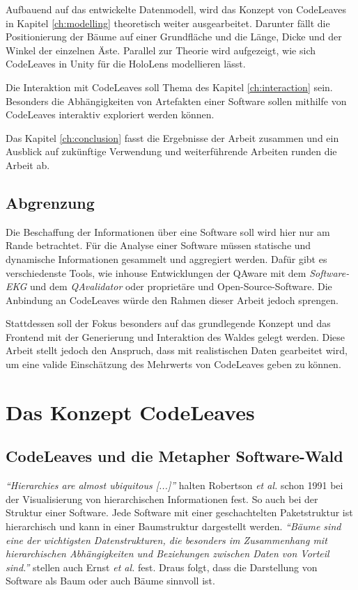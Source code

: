 Aufbauend auf das entwickelte Datenmodell, wird das Konzept von CodeLeaves in Kapitel \ref{ch:modelling} theoretisch weiter ausgearbeitet. Darunter fällt die Positionierung der Bäume auf einer Grundfläche und die Länge, Dicke und der Winkel der einzelnen Äste. Parallel zur Theorie wird aufgezeigt, wie sich CodeLeaves in Unity für die HoloLens modellieren lässt.

Die Interaktion mit CodeLeaves soll Thema des Kapitel \ref{ch:interaction} sein. Besonders die Abhängigkeiten von Artefakten einer Software sollen mithilfe von CodeLeaves interaktiv exploriert werden können.

Das Kapitel \ref{ch:conclusion} fasst die Ergebnisse der Arbeit zusammen und ein Ausblick auf zukünftige Verwendung und weiterführende Arbeiten runden die Arbeit ab.

\section{Abgrenzung}
\label{sec:distinction}

Die Beschaffung der Informationen über eine Software soll wird hier nur am Rande betrachtet. Für die Analyse einer Software müssen statische und dynamische Informationen gesammelt und aggregiert werden. Dafür gibt es verschiedenste Tools, wie inhouse Entwicklungen der QAware mit dem \textit{Software-EKG} und dem \textit{QAvalidator} oder proprietäre und Open-Source-Software. Die Anbindung an CodeLeaves würde den Rahmen dieser Arbeit jedoch sprengen.

Stattdessen soll der Fokus besonders auf das grundlegende Konzept und das Frontend mit der Generierung und Interaktion des Waldes gelegt werden. Diese Arbeit stellt jedoch den Anspruch, dass mit realistischen Daten gearbeitet wird, um eine valide Einschätzung des Mehrwerts von CodeLeaves geben zu können.

\chapter{Das Konzept CodeLeaves}
\label{ch:concept}

\section{CodeLeaves und die Metapher Software-Wald}
\label{sec:idea}

\emph{``Hierarchies are almost ubiquitous [...]''} \cite{robertson1991cone} halten Robertson \emph{et al.}
 schon 1991 bei der Visualisierung von hierarchischen Informationen fest. So auch bei der Struktur einer Software. Jede Software mit einer geschachtelten Paketstruktur ist hierarchisch und kann in einer Baumstruktur dargestellt werden. \emph{"`Bäume sind eine der wichtigsten Datenstrukturen, die besonders im Zusammenhang mit hierarchischen Abhängigkeiten und Beziehungen zwischen Daten von Vorteil sind."'} \cite{ernst2016grundkurs} stellen auch Ernst \emph{et al.} fest. Draus folgt, dass die Darstellung von Software als Baum oder auch Bäume sinnvoll ist.

